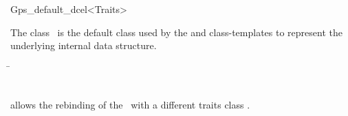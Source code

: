 \ccRefPageBegin

\begin{ccRefClass}{Gps_default_dcel<Traits>}

\ccDefinition
The class \ccRefName\ is the default \dcel{} class used by the
 and  class-templates
to represent the underlying internal  data structure.


\ccIsModel

\ccInheritsFrom
  \begin{tabbing}
    \= \\
                        \>\\
                        \>
  \end{tabbing}

\ccTypes

   {allows the rebinding of the \dcel\ with a different traits class .}


\end{ccRefClass}

\ccRefPageEnd
